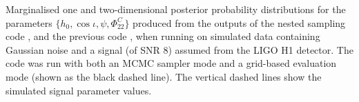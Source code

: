 \label{fig:simsignal_single}
Marginalised one and two-dimensional posterior probability distributions
for the parameters $\{h_0, \cos{\iota}, \psi, \Phi_{22}^C\}$
produced from the outputs of the nested sampling code \lppen, and the previous
code \lppe, when running on simulated data containing Gaussian noise and a signal 
(of SNR 8) assumed from the LIGO H1 detector. The \lppe code was run with both an MCMC sampler mode and a grid-based
evaluation mode (shown as the black dashed line). The vertical dashed lines show the simulated signal parameter values.

